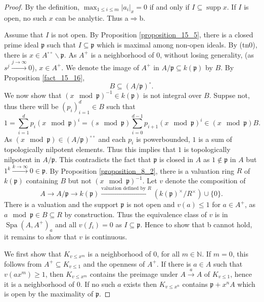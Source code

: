 \documentclass[8pt]{article}
\numberwithin{equation}{section}
\DeclareMathOperator{\supp}{supp}
\DeclareMathOperator{\Spa}{Spa}
\newcommand{\N}[0]{\mathbb{N}}
\newcommand{\p}[0]{\mathfrak{p}}
\newcommand{\ab}[1]{\vert #1 \vert}
\newcommand{\dcirc}[0]{{\circ\circ}}
\begin{document}
\begin{proof}
    By the definition, $\max_{1\leq i\leq m}\ab{a_i}_x=0$ if and only if $I\subseteq\supp x$. If $I$ is open, no such $x$ can be analytic. Thus a$\Rightarrow$b.
    \par Assume that $I$ is not open. By Proposition \ref{proposition_15_5}, there is a closed prime ideal $\p$ such that $I\subseteq \p$ which is maximal among non-open ideals. By (tn0), there is $x\in A^\dcirc\backslash\p$. As $A^+$ is a neighborhood of $0$, without losing generality, (as $s^j\stackrel{j\to\infty}{\to} 0$), $x\in A^+$.
    We denote the image of $A^+$ in $A/\p\subseteq k(\p)$ by $B$. By Proposition \ref{fact_15_16}, 
    \begin{equation}
        B\subseteq(A/\p)^\circ.
    \end{equation}
    We now show that $(x\mod\p)^{-1}\in k(\p)$ is not integral over $B$. Suppse not, thus there will be $(p_i)^d_{i=1}\in B$ such that 
    \begin{equation*}
        1 = \sum_{i=1}^d p_i(x\mod\p)^i = (s\mod\p)\sum_{i=0}^{d-1}p_{i+1}(x\mod\p)^i \in (x\mod\p)B.
    \end{equation*}
As $(x\mod\p)\in (A/\p)^\dcirc$ and each $p_i$ is powerbounded, $1$ is a sum of topologically nilpotent elements. Thus this implies that $1$ is topologically nilpotent in $A/\p$. This contradicts the fact that $\p$ is closed in $A$ as $1\not\in\p$ in $A$ but $1^k\stackrel{k\to\infty}{\to}0\in\p$.
By Proposition \ref{proposition_8_2}, there is a valuation ring $R$ of $k(\p)$ containing $B$ but not $(x\mod\p)^{-1}$. Let $v$ denote the composition of 
\begin{equation*}
    A\to A/\p \to k(\p)\stackrel{\text{valuation defined by $R$}}{\to}(k(\p)^\times/R^\times)\cup\{0\}.
\end{equation*}
There is a valuation and the support $\p$ is not open and $v(a)\leq1$ for $a\in A^+$, as $a\mod\p\in B\subseteq R$ by construction. 
Thus the equivalence class of $v$ is in $\Spa(A,A^+)_a$ and all $v(f_i)=0$ as $I\subseteq\p$. Hence to show that b cannot hold, it remains to show that $v$ is continuous. 
\par We first show that $K_{v\leq x^m}$ is a neighborhood of $0$, for all $m\in\N$. If $m=0$, this follows from $A^+\subseteq K_{v\leq 1}$ and the openness of $A^+$. If there is $a\in A$ such that $v(ax^m)\geq1$, then $K_{v\leq x^m}$ contains the preimage under $A\stackrel{a}{\to}A$ of $K_{v\leq1}$, hence it is a neighborhood of $0$. If no such $a$ exists then $K_{v\leq x^n}$ contains $\p+x^n A$ which is open by the maximality of $\p$. 

\end{proof}
\end{document}
